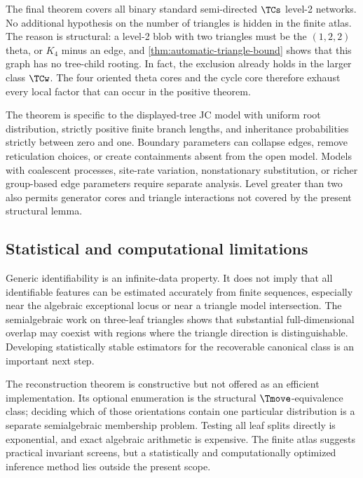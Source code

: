 The final theorem covers all binary standard semi-directed $\TCs$ level-2 networks.  No additional hypothesis on the number of triangles is hidden in the finite atlas.  The reason is structural: a level-2 blob with two triangles must be the $(1,2,2)$ theta, or $K_4$ minus an edge, and \cref{thm:automatic-triangle-bound} shows that this graph has no tree-child rooting.  In fact, the exclusion already holds in the larger class $\TCw$.  The four oriented theta cores and the cycle core therefore exhaust every local factor that can occur in the positive theorem.

The theorem is specific to the displayed-tree JC model with uniform root distribution, strictly positive finite branch lengths, and inheritance probabilities strictly between zero and one.  Boundary parameters can collapse edges, remove reticulation choices, or create containments absent from the open model.  Models with coalescent processes, site-rate variation, nonstationary substitution, or richer group-based edge parameters require separate analysis.  Level greater than two also permits generator cores and triangle interactions not covered by the present structural lemma.

\subsection{Statistical and computational limitations}

Generic identifiability is an infinite-data property.  It does not imply that all identifiable features can be estimated accurately from finite sequences, especially near the algebraic exceptional locus or near a triangle model intersection.  The semialgebraic work on three-leaf triangles shows that substantial full-dimensional overlap may coexist with regions where the triangle direction is distinguishable.  Developing statistically stable estimators for the recoverable canonical class is an important next step.

The reconstruction theorem is constructive but not offered as an efficient implementation.  Its optional enumeration is the structural $\Tmove$-equivalence class; deciding which of those orientations contain one particular distribution is a separate semialgebraic membership problem.  Testing all leaf splits directly is exponential, and exact algebraic arithmetic is expensive.  The finite atlas suggests practical invariant screens, but a statistically and computationally optimized inference method lies outside the present scope.


